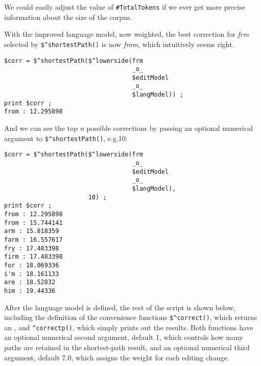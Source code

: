 \noindent
We could easily adjust the value of \verb!#TotalTokens! if we ever get more
precise information about the size of the corpus.

With the improved language model, now weighted, the best correction for \emph{frm} selected by
\verb!$^shortestPath()! is now \emph{from}, which intuitively seems right.

\begin{Verbatim}
$corr = $^shortestPath($^lowerside(frm 
                                   _o_ 
                                   $editModel 
                                   _o_ 
                                   $langModel)) ;
print $corr ;
from : 12.295898
\end{Verbatim}

\noindent
And we can see the top \emph{n} possible corrections by passing an optional numerical
argument to \verb!$^shortestPath()!, e.g.\@ 10:

\begin{Verbatim}
$corr = $^shortestPath($^lowerside(frm 
                                   _o_ 
                                   $editModel 
                                   _o_ 
                                   $langModel), 
                       10) ;
print $corr ;
from : 12.295898
from : 15.744141
arm : 15.818359
farm : 16.557617
fry : 17.483398
firm : 17.483398
for : 18.069336
i'm : 18.161133
are : 18.52832
him : 19.44336
\end{Verbatim}

After the language model is defined, the rest of the script is shown below,
including the definition of the convenience 
functions \verb!$^correct()!, which returns an \fsm{},
and \verb!^correctp()!, which simply prints out the results.  Both functions have an
optional numerical second argument, default 1, which controls how many paths are
retained in the shortest-path result, and an optional numerical third argument, 
default 7.0, which assigns the
weight for each editing change.

